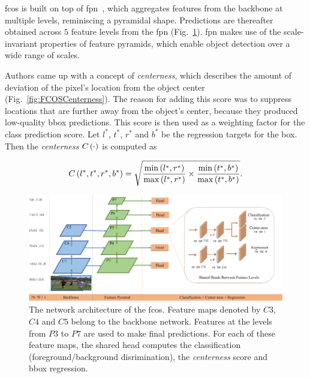 \Gls{fcos} is built on top of \gls{fpn}~\cite{li2019weightedfpn}, which aggregates features from the backbone at multiple levels, reminiscing a pyramidal shape. Predictions are thereafter obtained across $5$ feature levels from the \gls{fpn} (Fig.~\ref{fig:FCOSFeaturePyramid}). \gls{fpn} makes use of the scale-invariant properties of feature pyramids, which enable object detection over a wide range of scales.

Authors came up with a concept of \emph{centerness}, which describes the amount of deviation of the pixel's location from the object center (Fig.~\ref{fig:FCOSCenterness}). The reason for adding this score was to suppress locations that are further away from the object's center, because they produced low-quality \gls{bbox} predictions. This score is then used as a weighting factor for the class prediction score. Let $l^*$, $t^*$, $r^*$ and $b^*$ be the regression targets for the box. Then the \emph{centerness} ${C} \left( \cdot \right)$ is computed as

\begin{equation}
    \label{eq:CenternessDetection}
    {C} \left( l^*, t^*, r^*, b^* \right) =
    \sqrt{
        \frac{
            {\min} \left( l^*, r^* \right)
        }{
            {\max} \left( l^*, r^* \right)
        }
        \times
        \frac{
            {\min} \left( t^*, b^* \right)
        }{
            {\max} \left( t^*, b^* \right)
        }
    }.
\end{equation}


\begin{figure}[t]
    \centerline{\includegraphics[width=\linewidth]{figures/theoretical_foundations/fcos_feature_pyramid.pdf}}
    \caption[\Gls{fcos} architecture]{The network architecture of the \gls{fcos}. Feature maps denoted by $C3$, $C4$ and $C5$ belong to the backbone network. Features at the levels from $P3$ to $P7$ are used to make final predictions. For each of these feature maps, the shared head computes the classification (foreground/background disrimination), the \emph{centerness} score and \gls{bbox} regression. }
    \label{fig:FCOSFeaturePyramid}
\end{figure}


